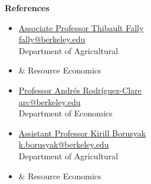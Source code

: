 \documentclass[10pt, oneside]{article}
\begin{document}
\begin{minipage}[t]{0.1\linewidth}
\textbf{References}
\end{minipage}\hspace{0.04\linewidth}
\begin{minipage}[t]{0.3\linewidth}
\begin{itemize}[noitemsep,nolistsep]
\item[] \underline{Associate Professor Thibault Fally} \\
\href{mailto:fally@berkeley.edu}{fally@berkeley.edu} \\ 
Department of Agricultural
\item[] \hspace{4mm} \& Resource Economics \\
\item[] \underline{Professor Andr\'es Rodr\'iguez-Clare} \\
\href{mailto:arc@berkeley.edu}{arc@berkeley.edu} \\
Department of Economics
\end{itemize}
\end{minipage}
\begin{minipage}[t]{0.4\linewidth}
\begin{itemize}[noitemsep,nolistsep]
    \item[] \underline{Assistant Professor Kirill Borusyak} \\
\href{k.borusyak@berkeley.edu}{k.borusyak@berkeley.edu} \\ 
Department of Agricultural
\item[] \hspace{4mm} \& Resource Economics
\end{itemize}
\end{minipage}\vspace{5mm}
\end{document}
